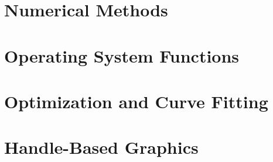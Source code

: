 \documentclass{book}
\begin{document}
\chapter{Numerical Methods}



\chapter{Operating System Functions}
















\chapter{Optimization and Curve Fitting}










\chapter{Handle-Based Graphics}















































































\end{document}
